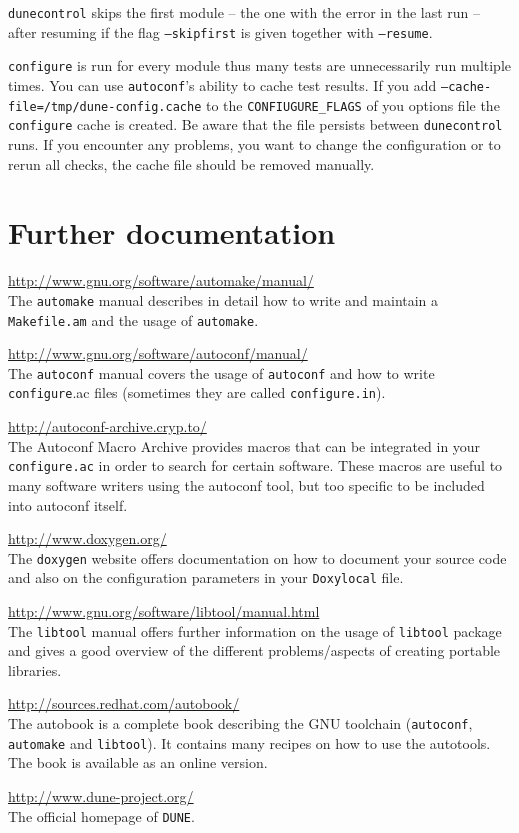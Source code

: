 \documentclass[11pt,a4paper,headinclude,footinclude,DIV16,normalheadings]{scrartcl}
\newcommand{\dune}{\texttt{DUNE}\xspace}
\newcommand{\autoconf}{\texttt{autoconf}\xspace}
\newcommand{\automake}{\texttt{automake}\xspace}
\newcommand{\libtool}{\texttt{libtool}\xspace}
\newcommand{\configure}{\texttt{configure}\xspace}
\newcommand{\configureac}{\texttt{configure.ac}\xspace}
\newcommand{\makefileam}{\texttt{Makefile.am}\xspace}
\newcommand{\dunecontrol}{\texttt{dunecontrol}\xspace}
\begin{document}
\dunecontrol skips the first module -- the one with the error in the last run -- after
resuming if the flag \texttt{--skipfirst} is given together with \texttt{--resume}.

\configure is run for every module thus many tests are unnecessarily run multiple times.
You can use \autoconf's ability to cache test results. If you add 
\texttt{--cache-file=/tmp/dune-config.cache} to the \texttt{CONFIUGURE\_FLAGS} of
you options file the \configure  cache is created. Be aware that the file persists 
between \dunecontrol runs. If you encounter any problems, you want to change the 
configuration or to rerun all checks, the cache file should be removed manually.

\section{Further documentation}

\url{http://www.gnu.org/software/automake/manual/}\\
The \automake manual describes in detail how to write and maintain a
\makefileam and the usage of \automake.

\url{http://www.gnu.org/software/autoconf/manual/}\\
The \autoconf manual covers the usage of \autoconf and how to write
\configure.ac files (sometimes they are called \texttt{configure.in}).

\url{http://autoconf-archive.cryp.to/}\\
The Autoconf Macro Archive provides macros that can be integrated in
your \configureac in order to search for certain software. These
macros are useful to many software writers using the autoconf tool, but too
specific to be included into autoconf itself.

\url{http://www.doxygen.org/}\\
The \texttt{doxygen} website offers documentation on how to document
your source code and also on the configuration parameters in your
\texttt{Doxylocal} file.

\url{http://www.gnu.org/software/libtool/manual.html}\\
The \libtool manual offers further information on the usage of
\libtool package and gives a good overview of the different
problems/aspects of creating portable libraries.

\url{http://sources.redhat.com/autobook/}\\
The autobook is a complete book describing the GNU toolchain
(\autoconf, \automake and \libtool). It contains many recipes on how
to use the autotools. The book is available as an online 
version.

\url{http://www.dune-project.org/}\\
The official homepage of \dune.
\end{document}
